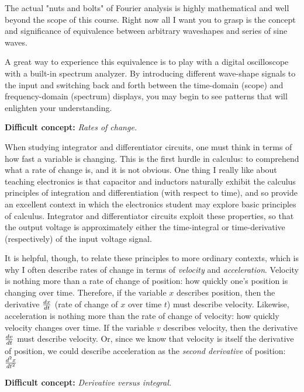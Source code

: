 The actual "nuts and bolts" of Fourier analysis is highly mathematical and well beyond the scope of this course.  Right now all I want you to grasp is the concept and significance of equivalence between arbitrary waveshapes and series of sine waves.

A great way to experience this equivalence is to play with a digital oscilloscope with a built-in spectrum analyzer.  By introducing different wave-shape signals to the input and switching back and forth between the time-domain (scope) and frequency-domain (spectrum) displays, you may begin to see patterns that will enlighten your understanding.

\vskip 10pt

\noindent
{\bf Difficult concept: } {\it Rates of change.}

When studying integrator and differentiator circuits, one must think in terms of how fast a variable is changing.  This is the first hurdle in calculus: to comprehend what a rate of change is, and it is not obvious.  One thing I really like about teaching electronics is that capacitor and inductors naturally exhibit the calculus principles of integration and differentiation (with respect to time), and so provide an excellent context in which the electronics student may explore basic principles of calculus.  Integrator and differentiator circuits exploit these properties, so that the output voltage is approximately either the time-integral or time-derivative (respectively) of the input voltage signal.

It is helpful, though, to relate these principles to more ordinary contexts, which is why I often describe rates of change in terms of {\it velocity} and {\it acceleration}.  Velocity is nothing more than a rate of change of position: how quickly one's position is changing over time.  Therefore, if the variable $x$ describes position, then the derivative ${dx \over dt}$ (rate of change of $x$ over time $t$) must describe velocity.  Likewise, acceleration is nothing more than the rate of change of velocity: how quickly velocity changes over time.  If the variable $v$ describes velocity, then the derivative ${dv \over dt}$ must describe velocity.  Or, since we know that velocity is itself the derivative of position, we could describe acceleration as the {\it second derivative} of position: ${d^2 x \over dt^2}$

\vskip 10pt

\noindent
{\bf Difficult concept: } {\it Derivative versus integral.}

